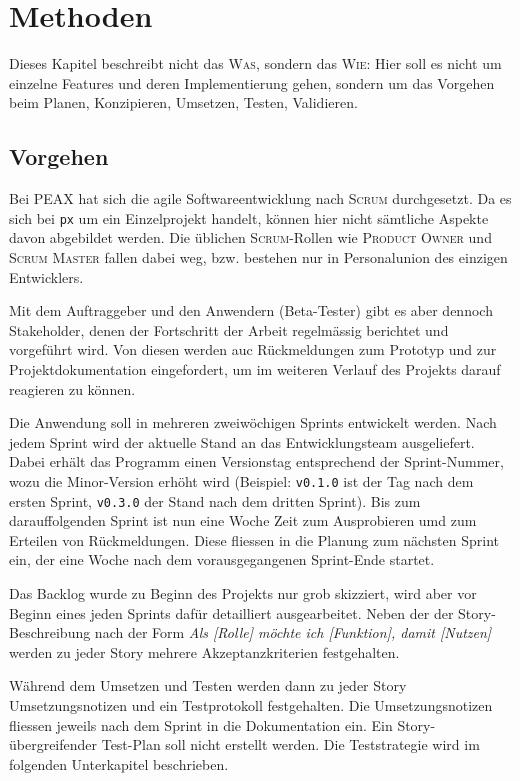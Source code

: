 \section{Methoden}

Dieses Kapitel beschreibt nicht das \textsc{Was}, sondern das \textsc{Wie}: Hier soll es nicht um einzelne Features und deren Implementierung gehen, sondern um das Vorgehen beim Planen, Konzipieren, Umsetzen, Testen, Validieren. 

\subsection{Vorgehen}
\label{sec:Vorgehen}

Bei PEAX hat sich die agile Softwareentwicklung nach \textsc{Scrum} durchgesetzt. Da es sich bei \texttt{px} um ein Einzelprojekt handelt, können hier nicht sämtliche Aspekte davon abgebildet werden. Die üblichen \textsc{Scrum}-Rollen wie \textsc{Product Owner} und \textsc{Scrum Master} fallen dabei weg, bzw. bestehen nur in Personalunion des einzigen Entwicklers.

Mit dem Auftraggeber und den Anwendern (Beta-Tester) gibt es aber dennoch Stakeholder, denen der Fortschritt der Arbeit regelmässig berichtet und vorgeführt wird. Von diesen werden auc Rückmeldungen zum Prototyp und zur Projektdokumentation eingefordert, um im weiteren Verlauf des Projekts darauf reagieren zu können.

Die Anwendung soll in mehreren zweiwöchigen Sprints entwickelt werden. Nach jedem Sprint wird der aktuelle Stand an das Entwicklungsteam ausgeliefert. Dabei erhält das Programm einen Versionstag entsprechend der Sprint-Nummer, wozu die Minor-Version erhöht wird (Beispiel: \texttt{v0.1.0} ist der Tag nach dem ersten Sprint, \texttt{v0.3.0} der Stand nach dem dritten Sprint). Bis zum darauffolgenden Sprint ist nun eine Woche Zeit zum Ausprobieren umd zum Erteilen von Rückmeldungen. Diese fliessen in die Planung zum nächsten Sprint ein, der eine Woche nach dem vorausgegangenen Sprint-Ende startet.

Das Backlog wurde zu Beginn des Projekts nur grob skizziert, wird aber vor Beginn eines jeden Sprints dafür detailliert ausgearbeitet. Neben der der Story-Beschreibung nach der Form \textit{Als [Rolle] möchte ich [Funktion], damit [Nutzen]} werden zu jeder Story mehrere Akzeptanzkriterien festgehalten.

Während dem Umsetzen und Testen werden dann zu jeder Story Umsetzungsnotizen und ein Testprotokoll festgehalten. Die Umsetzungsnotizen fliessen jeweils nach dem Sprint in die Dokumentation ein. Ein Story-übergreifender Test-Plan soll nicht erstellt werden. Die Teststrategie wird im folgenden Unterkapitel beschrieben.

